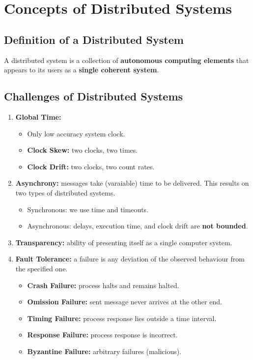 \section{Concepts of Distributed Systems}

\subsection{Definition of a Distributed System}

A distributed system is a collection of \textbf{autonomous computing elements} that appears to its users as a \textbf{single coherent system}.

\subsection{Challenges of Distributed Systems}

\begin{enumerate}
    \item \textbf{Global Time:}
    \begin{itemize}
        \item Only low accuracy system clock.
        \item \textbf{Clock Skew:} two clocks, two times.
        \item \textbf{Clock Drift:} two clocks, two count rates.
    \end{itemize}
    \item \textbf{Asynchrony:} messages take (varaiable) time to be delivered.
        This results on two types of distributed systems.
    \begin{itemize}
        \item Synchronous: we use time and timeouts.
        \item Asynchronous: delays, execution time, and clock drift are \textbf{not bounded}.
    \end{itemize}
    \item \textbf{Transparency:} ability of presenting itself as a single computer system.
    \item \textbf{Fault Tolerance:} a failure is any deviation of the observed behaviour from the specified one.
    \begin{itemize}
        \item \textbf{Crash Failure:} process halts and remains halted.
        \item \textbf{Omission Failure:} sent message never arrives at the other end.
        \item \textbf{Timing Failure:} process response lies outside a time interval.
        \item \textbf{Response Failure:} process response is incorrect.
        \item \textbf{Byzantine Failure:} arbitrary failures (malicious).
    \end{itemize}
\end{enumerate}
